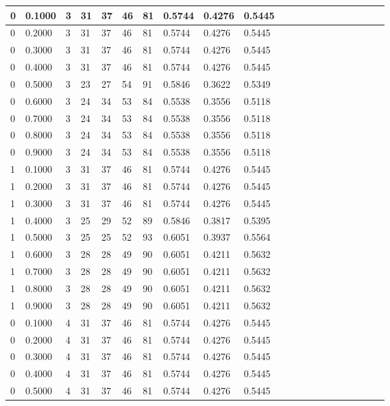 \documentclass[12pt]{article}
\begin{document}
\begin{flushleft}
{\begin{tabular}{| l | l | l | l | l | l | l | l | l | l | l | l | l | l | l | l | l | l | l | l | l |}
				0 & 0.1000 & 3 & 31 & 37 & 46 & 81 & 0.5744 & 0.4276 & 0.5445\\ \hline
				0 & 0.2000 & 3 & 31 & 37 & 46 & 81 & 0.5744 & 0.4276 & 0.5445\\ \hline
				0 & 0.3000 & 3 & 31 & 37 & 46 & 81 & 0.5744 & 0.4276 & 0.5445\\ \hline
				0 & 0.4000 & 3 & 31 & 37 & 46 & 81 & 0.5744 & 0.4276 & 0.5445\\ \hline
				0 & 0.5000 & 3 & 23 & 27 & 54 & 91 & 0.5846 & 0.3622 & 0.5349\\ \hline
				0 & 0.6000 & 3 & 24 & 34 & 53 & 84 & 0.5538 & 0.3556 & 0.5118\\ \hline
				0 & 0.7000 & 3 & 24 & 34 & 53 & 84 & 0.5538 & 0.3556 & 0.5118\\ \hline
				0 & 0.8000 & 3 & 24 & 34 & 53 & 84 & 0.5538 & 0.3556 & 0.5118\\ \hline
				0 & 0.9000 & 3 & 24 & 34 & 53 & 84 & 0.5538 & 0.3556 & 0.5118\\ \hline
				1 & 0.1000 & 3 & 31 & 37 & 46 & 81 & 0.5744 & 0.4276 & 0.5445\\ \hline
				1 & 0.2000 & 3 & 31 & 37 & 46 & 81 & 0.5744 & 0.4276 & 0.5445\\ \hline
				1 & 0.3000 & 3 & 31 & 37 & 46 & 81 & 0.5744 & 0.4276 & 0.5445\\ \hline
				1 & 0.4000 & 3 & 25 & 29 & 52 & 89 & 0.5846 & 0.3817 & 0.5395\\ \hline
				1 & 0.5000 & 3 & 25 & 25 & 52 & 93 & 0.6051 & 0.3937 & 0.5564\\ \hline
				1 & 0.6000 & 3 & 28 & 28 & 49 & 90 & 0.6051 & 0.4211 & 0.5632\\ \hline
				1 & 0.7000 & 3 & 28 & 28 & 49 & 90 & 0.6051 & 0.4211 & 0.5632\\ \hline
				1 & 0.8000 & 3 & 28 & 28 & 49 & 90 & 0.6051 & 0.4211 & 0.5632\\ \hline
				1 & 0.9000 & 3 & 28 & 28 & 49 & 90 & 0.6051 & 0.4211 & 0.5632\\ \hline
				0 & 0.1000 & 4 & 31 & 37 & 46 & 81 & 0.5744 & 0.4276 & 0.5445\\ \hline
				0 & 0.2000 & 4 & 31 & 37 & 46 & 81 & 0.5744 & 0.4276 & 0.5445\\ \hline
				0 & 0.3000 & 4 & 31 & 37 & 46 & 81 & 0.5744 & 0.4276 & 0.5445\\ \hline
				0 & 0.4000 & 4 & 31 & 37 & 46 & 81 & 0.5744 & 0.4276 & 0.5445\\ \hline
				0 & 0.5000 & 4 & 31 & 37 & 46 & 81 & 0.5744 & 0.4276 & 0.5445\\ \hline

\end{tabular}}
\end{flushleft}
\end{document}
